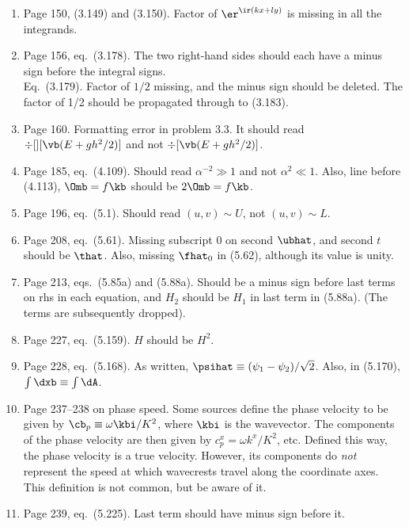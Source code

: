 \documentclass[10pt]{article}
\newcommand{\eq}{eq.\ } \newcommand{\Eq}{Eq.\ }
\begin{document}
\begin{enumerate}
\item Page 150, (3.149) and (3.150). Factor of $\er^{\ir (kx + ly)}$ is missing in all the integrands.

\item Page 156, \eq (3.178). The two right-hand sides should each have a minus sign before the integral signs. \\
\Eq (3.179). Factor of $1/2$ missing, and the minus sign should be deleted. The factor of 1/2 should be propagated through to (3.183).

\item Page 160. Formatting error in problem 3.3. It should read $\div[][\vb(E + gh^2/2)]$ and not $\div[\vb(E + gh^2/2)]$.

\item Page 185, \eq (4.109). Should read $\alpha^{-2} \gg 1$ and not $\alpha^2 \ll 1$. Also, line before (4.113), $\Omb = f \kb$ should be $2\Omb = f \kb$.

\item Page 196, \eq (5.1). Should read $(u, v) \sim U$, not $(u,v) \sim L$.

\item Page 208, \eq (5.61). Missing subscript 0 on second $\ubhat$, and second $t$ should be $\that$. Also, missing $\fhat_0$ in (5.62), although its value is unity.

\item Page 213, eqs.\ (5.85a) and (5.88a). Should be a minus sign before last terms on rhs in each equation, and $H_2$ should be $H_1$ in last term in (5.88a). (The terms are subsequently dropped).

\item Page 227, \eq (5.159). $H$ should be $H^2$.

\item Page 228, \eq (5.168). As written, $\psihat \equiv (\psi_1 -\psi_2)/\sqrt 2$. Also, in (5.170), $\int \dxb \equiv \int \dA$.

\item Page 237--238 on phase speed. Some sources define the phase velocity to be given by $\cb_p \equiv \omega \kbi / K^2$, where $\kbi$ is the wavevector. The components of the phase velocity are then given by $c^x_p = \omega k^x/K^2$, etc. Defined this way, the phase velocity is a true velocity. However, its components do \emph{not} represent the speed at which wavecrests travel along the coordinate axes. This definition is not common, but be aware of it.

\item Page 239, \eq (5.225). Last term should have minus sign before it.


\end{enumerate}
\end{document}
